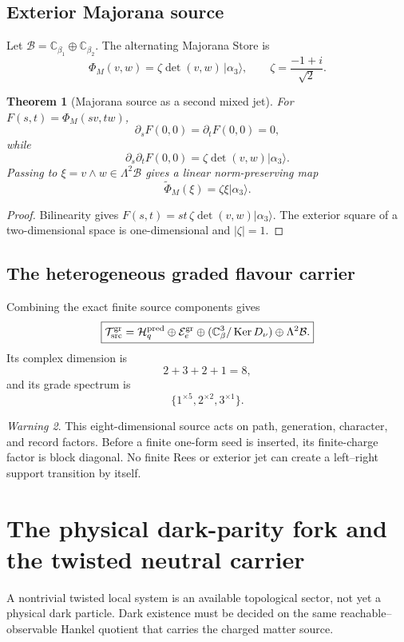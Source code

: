 \documentclass[11pt,oneside,openany]{book}
\numberwithin{equation}{chapter}
\newtheorem{theorem}{Theorem}[chapter]
\theoremstyle{definition}
\theoremstyle{remark}
\newtheorem{warning}[theorem]{Warning}
\newcommand{\C}{\mathbb C}
\newcommand{\Ker}{\operatorname{Ker}}
\begin{document}
\section{Exterior Majorana source}
Let $\mathcal B=\C_{\beta_1}\oplus\C_{\beta_2}$.  The alternating Majorana Store is
\[
 \Phi_M(v,w)
 =\zeta\det(v,w)\,|\alpha_3\rangle,
 \qquad
 \zeta=\frac{-1+i}{\sqrt2}.
\]

\begin{theorem}[Majorana source as a second mixed jet]
\label{thm:majorana-jet}
For $F(s,t)=\Phi_M(sv,tw)$,
\[
 \partial_sF(0,0)=\partial_tF(0,0)=0,
\]
while
\[
 \boxed{
 \partial_s\partial_tF(0,0)
 =\zeta\det(v,w)|\alpha_3\rangle.
 }
\]
Passing to $\xi=v\wedge w\in\Lambda^2\mathcal B$ gives a linear norm-preserving map
\[
 \widetilde\Phi_M(\xi)=\zeta\xi|\alpha_3\rangle.
\]
\end{theorem}

\begin{proof}
Bilinearity gives $F(s,t)=st\,\zeta\det(v,w)|\alpha_3\rangle$.  The exterior square of a two-dimensional space is one-dimensional and $|\zeta|=1$.
\end{proof}

\section{The heterogeneous graded flavour carrier}
Combining the exact finite source components gives
\[
 \boxed{
 \mathcal T_{\rm src}^{\rm gr}
 =\mathcal H_q^{\rm pred}
 \oplus\mathcal E_e^{\rm gr}
 \oplus(\C^3_\beta/\Ker D_\nu)
 \oplus\Lambda^2\mathcal B.
 }
\]
Its complex dimension is
\[
 2+3+2+1=8,
\]
and its grade spectrum is
\[
 \{1^{\times5},2^{\times2},3^{\times1}\}.
\]

\begin{warning}
This eight-dimensional source acts on path, generation, character, and record factors.  Before a finite one-form seed is inserted, its finite-charge factor is block diagonal.  No finite Rees or exterior jet can create a left--right support transition by itself.
\end{warning}

\chapter{The physical dark-parity fork and the twisted neutral carrier}
\label{ch:dark}

A nontrivial twisted local system is an available topological sector, not yet
a physical dark particle.  Dark existence must be decided on the same
reachable--observable Hankel quotient that carries the charged matter source.
\end{document}
